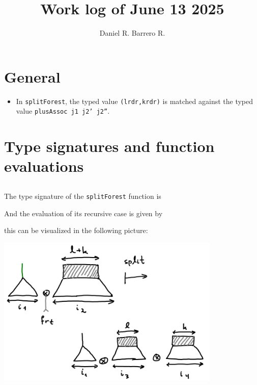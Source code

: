 \documentclass{amsart}
\title{Work log of June 13 2025}
\author{Daniel R. Barrero R.}
\begin{document}
\maketitle

\section{General}

\begin{itemize}
	\item In \texttt{splitForest}, the typed value \texttt{(lrdr,krdr)} is
		matched against the typed value \texttt{plusAssoc j1 j2' j2''}.
\end{itemize}

\newpage

\section{Type signatures and function evaluations}

\bigskip
\bigskip

\subsection{}

The type signature of the \texttt{splitForest} function is



\bigskip
\bigskip

And the evaluation of its recursive case is given by



\bigskip
\bigskip

this can be visualized in the following picture:

\bigskip
\bigskip

\includegraphics[width=0.8\textwidth]{forestSplit.png}
\end{document}
